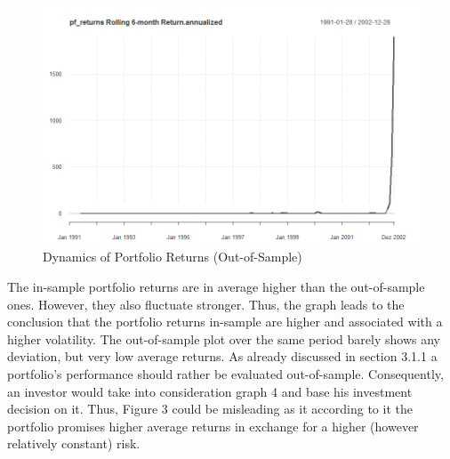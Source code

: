 \documentclass{article}
\begin{document}
\begin {figure}[H]
    \begin{center}
    \includegraphics[scale=0.4]{portolio_returns_dynamics_adjusted_out_of_sample.PNG}
    \caption{Dynamics of Portfolio Returns (Out-of-Sample)}
    \end{center}
\end{figure}
The in-sample portfolio returns are in average higher than the out-of-sample ones. However, they also fluctuate stronger. Thus, the graph leads to the conclusion that the portfolio returns in-sample are higher and associated with a higher volatility. The out-of-sample plot over the same period barely shows any deviation, but very low average returns. As already discussed in section 3.1.1 a portfolio's performance should rather be evaluated out-of-sample. Consequently, an investor would take into consideration graph 4 and base his investment decision on it. Thus, Figure 3 could be misleading as it according to it the portfolio promises higher average returns in exchange for a higher (however relatively constant) risk. 
\end{document}
